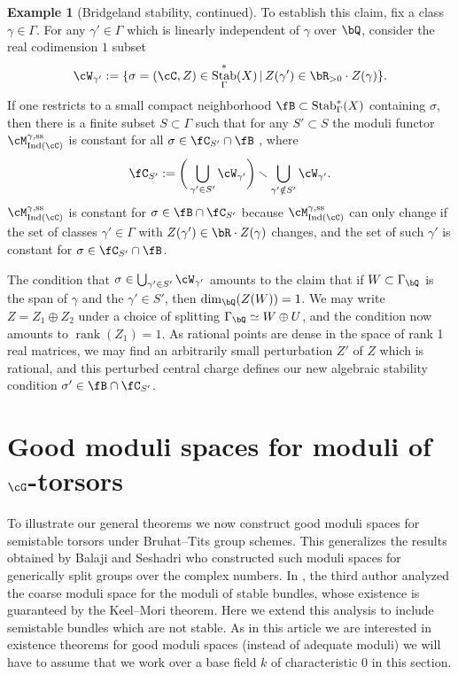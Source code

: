 \documentclass[a4paper]{amsart}
\numberwithin{equation}{section}
\theoremstyle{plain}
\theoremstyle{definition}
\newtheorem{ex}[thm]{Example}
\DeclareMathOperator{\Ind}{Ind}
\DeclareMathOperator{\rank}{rank}
\renewcommand{\ss}{{\rm ss}}
\DeclareMathOperator{\Stab}{Stab}
\begin{document}
\begin{ex} [Bridgeland stability, continued]
To establish this claim, fix a class $\gamma \in \Gamma$. For any $\gamma' \in \Gamma$ which is linearly independent of $\gamma$ over $\bQ$, consider the real codimension $1$ subset
\[
\cW_{\gamma'} := \{\sigma = (\cC,Z) \in \Stab_\Gamma^\ast(X) \, | \, Z(\gamma') \in \bR_{>0} \cdot Z(\gamma) \}.
\]
If one restricts to a small compact neighborhood $\fB\subset \Stab_\Gamma^\ast(X)$ containing $\sigma$, then there is a finite subset $S \subset \Gamma$ such that for any $S' \subset S$ the moduli functor $\cM_{\Ind(\cC)}^{\gamma,\ss}$ is constant for all $\sigma \in \fC_{S'} \cap \fB$ \cite[Prop.~2.8]{toda}, where
\[
\fC_{S'} := \bigg(\bigcup_{\gamma' \in S'} \cW_{\gamma'} \bigg) \smallsetminus \bigcup_{\gamma' \notin S'} \cW_{\gamma'}.
\]
$\cM_{\Ind(\cC)}^{\gamma,\ss}$ is constant for $\sigma \in \fB \cap \fC_{S'}$ because $\cM_{\Ind(\cC)}^{\gamma,\ss}$ can only change if the set of classes $\gamma' \in \Gamma$ with $Z(\gamma') \in \bR \cdot Z(\gamma)$ changes, and the set of such $\gamma'$ is constant for $\sigma \in \fC_{S'} \cap \fB$.

The condition that $\sigma \in \bigcup_{\gamma' \in S'} \cW_{\gamma'}$ amounts to the claim that if $W \subset \Gamma_\bQ$ is the span of $\gamma$ and the $\gamma' \in S'$, then $\dim_\bQ(Z(W)) = 1$. We may write $Z = Z_1 \oplus Z_2$ under a choice of splitting $\Gamma_\bQ \simeq W \oplus U$, and the condition now amounts to $\rank (Z_1) = 1$. As rational points are dense in the space of rank 1 real matrices, we may find an arbitrarily small perturbation $Z'$ of $Z$ which is rational, and this perturbed central charge defines our new algebraic stability condition $\sigma' \in \fB \cap \fC_{S'}$.
\end{ex}





\section{Good moduli spaces for moduli of \texorpdfstring{$\cG$}{G}-torsors}

To illustrate our general theorems we now construct good moduli spaces for semistable torsors under Bruhat--Tits group schemes. This generalizes the results obtained by Balaji and Seshadri who constructed such moduli spaces for generically split groups over the complex numbers. In \cite{heinloth-stability}, the third author analyzed the coarse moduli space for the moduli of stable bundles, whose existence is guaranteed by the Keel--Mori theorem. Here we extend this analysis to include semistable bundles which are not stable. As in this article we are interested in existence theorems for good moduli spaces (instead of adequate moduli) we will have to assume that we work over a base field $k$ of characteristic 0 in this section.
\end{document}
